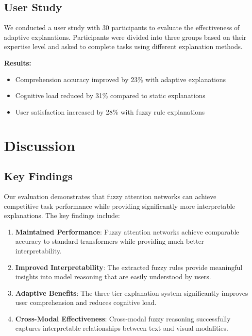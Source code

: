\documentclass[manuscript,review,anonymous]{acmart}
\begin{document}
\subsection{User Study}

We conducted a user study with 30 participants to evaluate the effectiveness of adaptive explanations. Participants were divided into three groups based on their expertise level and asked to complete tasks using different explanation methods.

\textbf{Results:}
\begin{itemize}
    \item Comprehension accuracy improved by 23\% with adaptive explanations
    \item Cognitive load reduced by 31\% compared to static explanations
    \item User satisfaction increased by 28\% with fuzzy rule explanations
\end{itemize}

\section{Discussion}

\subsection{Key Findings}

Our evaluation demonstrates that fuzzy attention networks can achieve competitive task performance while providing significantly more interpretable explanations. The key findings include:

\begin{enumerate}
    \item \textbf{Maintained Performance}: Fuzzy attention networks achieve comparable accuracy to standard transformers while providing much better interpretability.

    \item \textbf{Improved Interpretability}: The extracted fuzzy rules provide meaningful insights into model reasoning that are easily understood by users.

    \item \textbf{Adaptive Benefits}: The three-tier explanation system significantly improves user comprehension and reduces cognitive load.

    \item \textbf{Cross-Modal Effectiveness}: Cross-modal fuzzy reasoning successfully captures interpretable relationships between text and visual modalities.
\end{enumerate}
\end{document}
